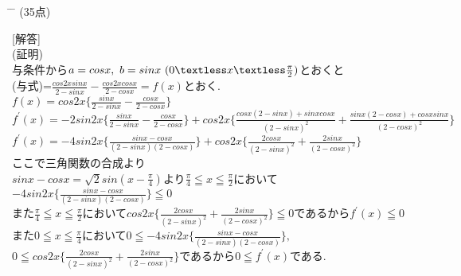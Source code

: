 \documentclass{article}
\begin{document}
\newpage
\begin{tabbing}
\hspace{0.91\textwidth} \= \hspace{0.8\textwidth} \= \kill
\textsf{}\> (35点)\>\\
\end{tabbing}
[{\large 解答}]\vspace{0.1in}\\
(証明)\vspace{0.1in}\\
与条件から$a=cosx,\ b=sinx\ (0\textless x \textless\frac{\pi}{2})$とおくと\vspace{0.1in}\\
(与式)=$\frac{cos2xsinx}{2-sinx}-\frac{cos2xcosx}{2-cosx}=f(x)$とおく.\vspace{0.1in}\\
$f(x)=cos2x\{ \frac{sinx}{2-sinx}-\frac{cosx}{2-cosx}\}$\vspace{0.1in}\\
$f^{\prime}(x)=-2sin2x\{ \frac{sinx}{2-sinx}-\frac{cosx}{2-cosx}\}+cos2x\{\frac{cosx(2-sinx)+sinxcosx}{(2-sinx)^2}+\frac{sinx(2-cosx)+cosxsinx}{(2-cosx)^2}\}$\vspace{0.1in}\\
$f^{\prime}(x)=-4sin2x\{ \frac{sinx-cosx}{(2-sinx)(2-cosx)}\}+cos2x\{\frac{2cosx}{(2-sinx)^2}+\frac{2sinx}{(2-cosx)^2}\}$\vspace{0.1in}\\
ここで三角関数の合成より\vspace{0.1in}\\
$sinx-cosx=\sqrt{2}sin(x-\frac{\pi}{4})$より$\frac{\pi}{4}\leqq x\leqq\frac{\pi}{2}$において\vspace{0.1in}\\
$-4sin2x\{ \frac{sinx-cosx}{(2-sinx)(2-cosx)}\}\leqq 0$\vspace{0.1in}\\
また$\frac{\pi}{4}\leqq x\leqq\frac{\pi}{2}$において$cos2x\{\frac{2cosx}{(2-sinx)^2}+\frac{2sinx}{(2-cosx)^2}\}\leqq 0$であるから$f^{\prime}(x)\leqq 0$\vspace{0.1in}\\
また$0\leqq x\leqq\frac{\pi}{4}$において$0\leqq -4sin2x\{ \frac{sinx-cosx}{(2-sinx)(2-cosx)}\},$\vspace{0.1in}\\
$0\leqq cos2x\{\frac{2cosx}{(2-sinx)^2}+\frac{2sinx}{(2-cosx)^2}\}$であるから$0\leqq f^{\prime}(x)$である. \vspace{0.1in}\\
\end{document}
